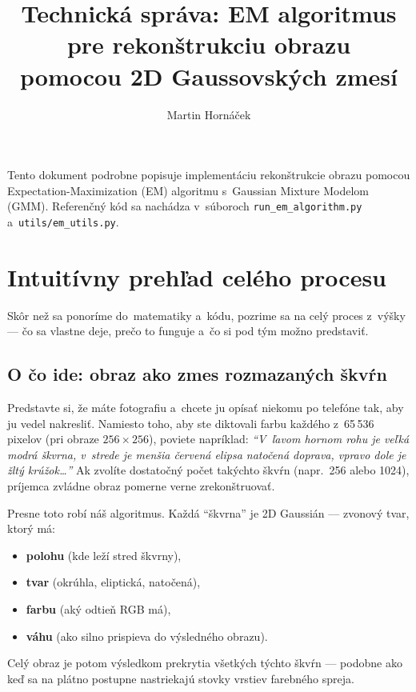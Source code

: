 \documentclass[a4paper,11pt]{article}
\title{\textbf{Technická správa: EM algoritmus pre rekonštrukciu obrazu\\pomocou 2D Gaussovských zmesí}}
\author{Martin Hornáček}
\date{}
\begin{document}
\maketitle

\noindent
Tento dokument podrobne popisuje implementáciu rekonštrukcie obrazu pomocou
Expectation-Maximization (EM) algoritmu s~Gaussian Mixture Modelom (GMM).
Referenčný kód sa nachádza v~súboroch \texttt{run\_em\_algorithm.py} a~\texttt{utils/em\_utils.py}.

\section{Intuitívny prehľad celého procesu}
\label{sec:overview}

Skôr než sa ponoríme do~matematiky a~kódu, pozrime sa na celý proces
z~výšky --- čo sa vlastne deje, prečo to funguje a~čo si pod tým
možno predstaviť.

\subsection{O čo ide: obraz ako zmes rozmazaných škvŕn}

Predstavte si, že máte fotografiu a~chcete ju opísať niekomu po telefóne
tak, aby ju vedel nakresliť.  Namiesto toho, aby ste diktovali farbu
každého z~65\,536 pixelov (pri obraze $256\times256$), poviete napríklad:
\emph{``V~ľavom hornom rohu je veľká modrá škvrna, v~strede je menšia
červená elipsa natočená doprava, vpravo dole je žltý krúžok\ldots''}
Ak zvolíte dostatočný počet takýchto škvŕn (napr.\ 256 alebo 1024),
príjemca zvládne obraz pomerne verne zrekonštruovať.

Presne toto robí náš algoritmus.  Každá ``škvrna'' je 2D Gaussián ---
zvonový tvar, ktorý má:
\begin{itemize}[nosep]
  \item \textbf{polohu} (kde leží stred škvrny),
  \item \textbf{tvar} (okrúhla, eliptická, natočená),
  \item \textbf{farbu} (aký odtieň RGB má),
  \item \textbf{váhu} (ako silno prispieva do výsledného obrazu).
\end{itemize}

\noindent
Celý obraz je potom výsledkom prekrytia všetkých týchto škvŕn ---
podobne ako keď sa na plátno postupne nastriekajú stovky vrstiev
farebného spreja.
\end{document}
